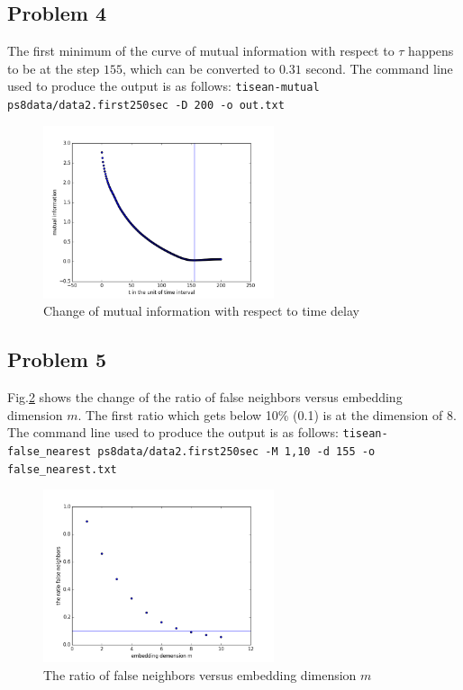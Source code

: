 \documentclass{article}
\begin{document}
\subsection*{Problem 4}
The first minimum of the curve of mutual information with respect to $\tau$ happens to be at the step $155$, which can be converted to $0.31$ second. The command line used to produce the output is as follows: \texttt{tisean-mutual ps8data/data2.first250sec -D 200 -o out.txt}

\begin{figure}[h]
  \centering
  \includegraphics[height=2in]{figs/q4.png}
  \caption{Change of mutual information with respect to time delay}
  \label{q4}
  \end{figure}
  
\subsection*{Problem 5}
Fig.\ref{q5} shows the change of the ratio of false neighbors versus embedding dimension $m$. The first ratio which gets below 10\% (0.1) is at the dimension of $8$.  The command line used to produce the output is as follows: \texttt{tisean-false\_nearest ps8data/data2.first250sec -M 1,10 -d 155 -o false\_nearest.txt}


\begin{figure}[h]
  \centering
  \includegraphics[height=2in]{figs/q5.png}
  \caption{The ratio of false neighbors versus embedding dimension $m$}
  \label{q5}
  \end{figure}
\end{document}
